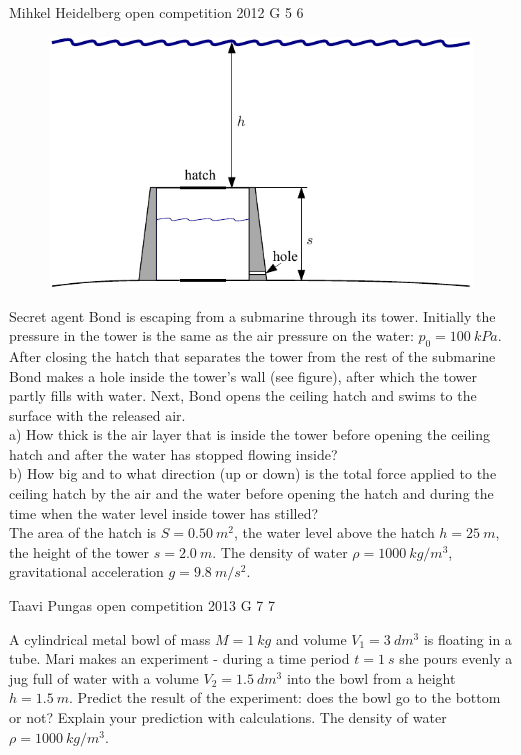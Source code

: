 \documentclass[11pt]{article}
\begin{document}
{Mihkel Heidelberg} %
{open competition} %
{2012} %
{G 5} %
{6} %
{

\ifEngStatement
\begin{figure}%
\includegraphics[width=\linewidth]{2012-lahg-05-allveelaev_g_ing}%
\end{figure}
Secret agent Bond is escaping from a submarine through its tower. Initially the pressure in the tower is the same as the air pressure on the water: $p_0 = \SI{100}{kPa}$. After closing the hatch that separates the tower from the rest of the submarine Bond makes a hole inside the tower’s wall (see figure), after which the tower partly fills with water. Next, Bond opens the ceiling hatch and swims to the surface with the released air.\\
a) How thick is the air layer that is inside the tower before opening the ceiling hatch and after the water has stopped flowing inside?\\
b) How big and to what direction (up or down) is the total force applied to the ceiling hatch by the air and the water before opening the hatch and during the time when the water level inside tower has stilled?\\
The area of the hatch is $S =
\SI{0,50}{m^2}$, the water level above the hatch $h=\SI{25}{m}$, the height of the tower $s=\SI{2,0}{m}$. The density of water $\rho = \SI{1000}{kg/m^3}$, gravitational acceleration $g =
\SI{9,8}{m/s^2}$.
\fi
}

{Taavi Pungas} %
{open competition} %
{2013} %
{G 7} %
{7} %
{

\ifEngStatement
A cylindrical metal bowl of mass $M=\SI{1}{kg}$ and volume $V_1=\SI{3}{dm^3}$ is floating in a tube. Mari makes an experiment - during a time period $t=\SI{1}{s}$ she pours evenly a jug full of water with a volume $V_2=\SI{1,5}{dm^3}$ into the bowl from a height $h=\SI{1,5}{m}$. Predict the result of the experiment: does the bowl go to the bottom or not? Explain your prediction with calculations. The density of water $\rho=\SI{1000}{kg/m^3}$.
\fi
}
\end{document}
